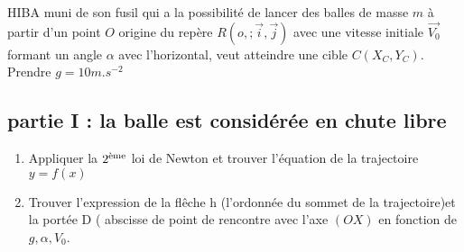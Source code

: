 \documentclass[12pt,a4paper]{article}
\begin{document}
\begin{minipage}{9cm}

HIBA muni de son fusil qui a la possibilité de lancer des balles de masse $m$ à partir d’un point $O$ origine du repère  $R(o,;\vec{i},\vec{j})$ 
avec une vitesse initiale $\vec{V_0}$ formant un angle $\alpha$ avec  l'horizontal, veut atteindre une cible  $C(X_C,Y_C)$. Prendre  $g= 10  m.s^{-2}$

\subsection*{partie I : la balle est considérée en chute libre }

\begin{enumerate}
\item Appliquer la $2\textsuperscript{ème}$ loi de Newton  et trouver l'équation de la trajectoire $y=f(x)$
\item Trouver l'expression de la flêche h (l'ordonnée du sommet de la trajectoire)et la portée D ( abscisse de point de rencontre avec l'axe $(OX)$ en fonction de $g,\alpha ,V_0$.

\end{enumerate}
\end{minipage}
\begin{minipage}{8cm}

\end{minipage}
\end{document}
